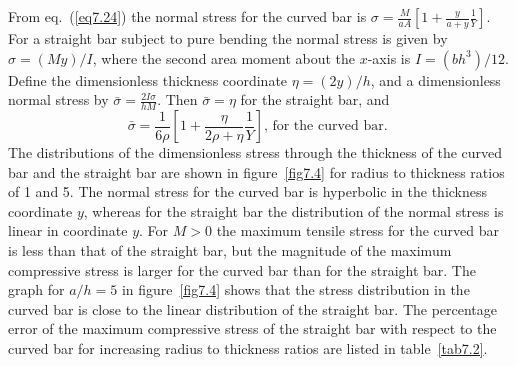 \documentclass{AeroStructure-ERJohnson}
\begin{document}
\begin{example}
\begin{table}[!h]%
\vspace*{-12pt}
\end{table}

From eq.~(\ref{eq7.24}) the normal stress for the curved bar is $\sigma=\frac{M}{a A}\left[1+\frac{y}{a+y} \frac{1}{Y}\right]$. For a straight bar subject to pure bending the normal stress is given by $\sigma=(M y) / I$, where the second area moment about the $x$-axis is\vadjust{\vspace*{6pt}\pagebreak} $I=\left(b h^{3}\right) / 12$. Define the dimensionless thickness coordinate $\eta=(2 y) / h$, and a dimensionless normal stress by $\bar{\sigma}=\frac{2 I \sigma}{h M}$. Then $\bar{\sigma}=\eta$ for the straight bar, and%
\begin{equation}
\bar{\sigma}=\frac{1}{6 \rho}\left[1+\frac{\eta}{2 \rho+\eta} \frac{1}{Y}\right] \text {, for the curved bar. } \label{eq7.1.d}\tag{d}
\end{equation}
The distributions of the dimensionless stress through the thickness of the curved bar and the straight bar are shown in figure~\ref{fig7.4} for radius to thickness ratios of 1 and 5. The normal stress for the curved bar is hyperbolic in the thickness coordinate $y$, whereas for the straight bar the distribution of the normal stress is linear in coordinate $y$. For $\textit{M} > 0$ the maximum tensile stress for the curved bar is less than that of the straight bar, but the magnitude of the maximum compressive stress is larger for the curved bar than for the straight bar. The graph for $a / h=5$ in figure~\ref{fig7.4} shows that the stress distribution in the curved bar is close to the linear distribution of the straight bar. The percentage error of the maximum compressive stress of the straight bar with respect to the curved bar for increasing radius to thickness ratios are listed in table~\ref{tab7.2}.




\end{example}
\end{document}

